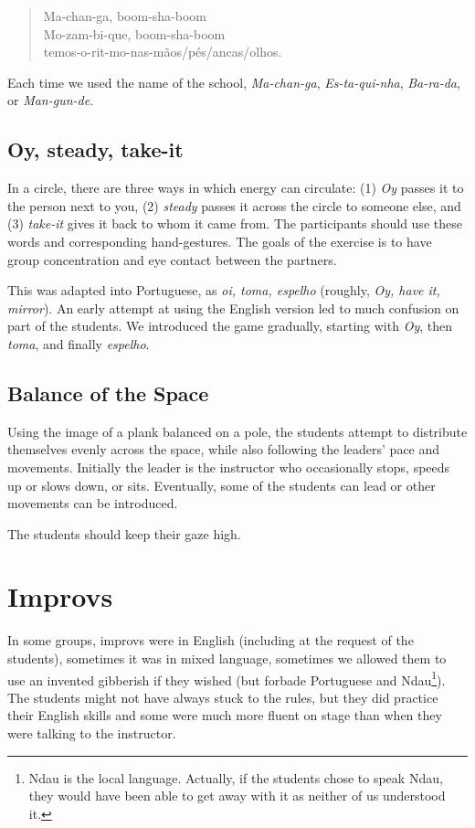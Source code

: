 \documentclass[article,twocolumn,twoside]{memoir}
\begin{document}
\begin{verse}
Ma-chan-ga, boom-sha-boom\\
Mo-zam-bi-que, boom-sha-boom\\
temos-o-rit-mo-nas-mãos/pés/ancas/olhos.
\end{verse}

Each time we used the name of the school, \textit{Ma-chan-ga},
\textit{Es-ta-qui-nha}, \textit{Ba-ra-da}, or \textit{Man-gun-de}.

\subsection{Oy, steady, take-it}
In a circle, there are three ways in which energy can circulate: (1)
\textit{Oy} passes it to the person next to you, (2) \textit{steady} passes it
across the circle to someone else, and (3) \textit{take-it} gives it back to
whom it came from. The participants should use these words and corresponding
hand-gestures. The goals of the exercise is to have group concentration and eye
contact between the partners.

This was adapted into Portuguese, as \textit{oi, toma, espelho} (roughly,
\textit{Oy, have it, mirror}). An early attempt at using the English version
led to much confusion on part of the students. We introduced the game
gradually, starting with \textit{Oy}, then \textit{toma}, and finally
\textit{espelho}.

\subsection{Balance of the Space}

Using the image of a plank balanced on a pole, the students attempt to
distribute themselves evenly across the space, while also following the
leaders' pace and movements. Initially the leader is the instructor who
occasionally stops, speeds up or slows down, or sits. Eventually, some of the
students can lead or other movements can be introduced.

The students should keep their gaze high.

\section{Improvs}

In some groups, improvs were in English (including at the request of the
students), sometimes it was in mixed language, sometimes we allowed them to use
an invented gibberish if they wished (but forbade Portuguese and
Ndau\footnote{Ndau is the local language. Actually, if the students chose to
speak Ndau, they would have been able to get away with it as neither of us
understood it.}). The students might not have always stuck to the rules, but
they did practice their English skills and some were much more fluent on stage
than when they were talking to the instructor.
\end{document}
